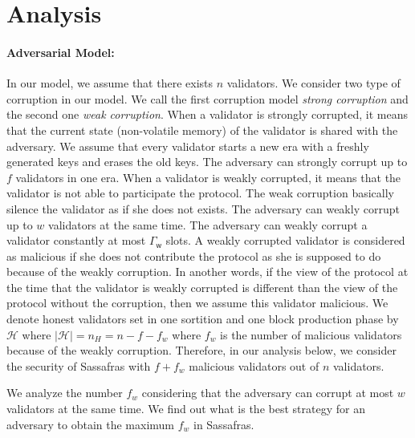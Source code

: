 \newcommand{\nweak}{\ensuremath{w}}
\newcommand{\weakperiod}{\ensuremath{\mathsf{\Gamma_\nweak}}}
\newcommand{\thweak}{\ensuremath{\tau_w}}
\newcommand{\numleak}{\ensuremath{\mathsf{leak}}}
\newcommand{\numanom}{\ensuremath{\mathtt{num\_anon}}}
\newcommand{\thpassers}{\ensuremath{\mathtt{th\_passers}}}
\newcommand{\ub}{\ensuremath{\mathsf{ub}}}
\newcommand{\lb}{\ensuremath{\mathsf{lb}}}
\newcommand{\lbsumL}{\ensuremath{\underline{ \vrfwinninglist}^{\mathsf{sum}}}}
\newcommand{\ubL}{\ensuremath{\bar{\vrfwinninglist}}}
\section{Analysis}

\paragraph{Adversarial Model:} In our model, we assume that there exists $ n $ validators.  We consider two type of corruption in our model. We call the first corruption model \emph{strong corruption} and the second one \emph{weak corruption}. When a validator is strongly corrupted, it means that the current state (non-volatile memory) of the validator is shared with the adversary. We assume that every validator starts a new era with a freshly generated keys and erases the old keys. The adversary can strongly corrupt up to $ f $ validators in one era.  
When a validator is weakly corrupted, it means that the validator is not able to participate the protocol. The weak corruption basically silence the validator as if she does not exists. The adversary can weakly corrupt up to $ \nweak $ validators at the same time. The adversary can weakly corrupt a validator constantly at most  $ \weakperiod $ slots. A weakly corrupted validator is considered as malicious if she does not contribute the protocol as she is supposed to do because of the weakly corruption.  In another words, if the view of the protocol at the time that the validator is weakly corrupted is different than the view of the protocol without the corruption, then we assume this validator malicious.  We denote honest validators set in one sortition and one block production phase by $ \mathcal{H} $ where $ |\mathcal{H}| = n_H = n-f - f_\nweak$ where $ f_\nweak $ is the number of malicious validators because of the weakly corruption.  Therefore, in our analysis below, we consider the security of Sassafras with $ f + f_{\nweak}$ malicious validators out of $ n $ validators. 

We analyze the number $ f_{\nweak} $ considering that the adversary can corrupt at most $ w $ validators at the same time. We find out what is the best strategy for an adversary to obtain the maximum $ f_{\nweak} $ in Sassafras.

